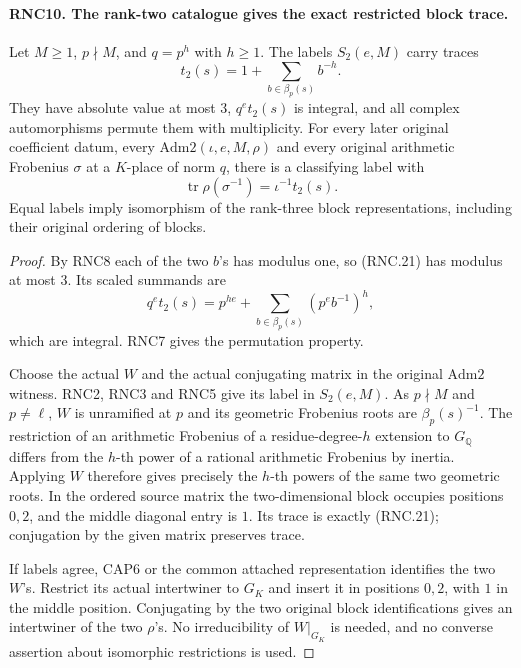 \documentclass[11pt,a4paper]{article}
\numberwithin{equation}{section}
\theoremstyle{remark}\newtheorem{remark}[theorem]{Remark}
\begin{document}
\paragraph{RNC10. The rank-two catalogue gives the exact restricted block trace.}
\label{claim:RNC10}
Let $M\geq1$, $p\nmid M$, and $q=p^h$ with $h\geq1$.
The labels $S_2(e,M)$ carry traces
\[
                  t_2(s)=1+\sum_{b\in\beta_p(s)}b^{-h}.
                                                               \tag{RNC.21}
\]
They have absolute value at most $3$, $q^e t_2(s)$ is
integral, and all complex automorphisms permute them with
multiplicity.  For every later original coefficient datum,
every $\mathrm{Adm2}(\iota,e,M,\rho)$ and every original
arithmetic Frobenius $\sigma$ at a $K$-place of norm $q$,
there is a classifying label with
\[
         \operatorname{tr}\rho(\sigma^{-1})=\iota^{-1}t_2(s).
                                                               \tag{RNC.22}
\]
Equal labels imply isomorphism of the rank-three block
representations, including their original ordering of blocks.
\begin{proof}
By RNC8 each of the two $b$'s has modulus one, so (RNC.21)
has modulus at most $3$.  Its scaled summands are
\[
 q^e t_2(s)=p^{he}+\sum_{b\in\beta_p(s)}(p^e b^{-1})^h,
                                                               \tag{RNC.23}
\]
which are integral.  RNC7 gives the permutation property.

Choose the actual $W$ and the actual conjugating matrix in
the original $\mathrm{Adm2}$ witness.  RNC2, RNC3 and RNC5
give its label in $S_2(e,M)$.  As $p\nmid M$ and
$p\ne\ell$, $W$ is unramified at $p$ and its geometric
Frobenius roots are $\beta_p(s)^{-1}$.  The restriction of
an arithmetic Frobenius of a residue-degree-$h$ extension
to $G_{\mathbb Q}$ differs from the $h$-th power of a
rational arithmetic Frobenius by inertia.  Applying $W$
therefore gives precisely the $h$-th powers of the same
two geometric roots.  In the ordered source matrix the
two-dimensional block occupies positions $0,2$, and the
middle diagonal entry is $1$.  Its trace is exactly
(RNC.21); conjugation by the given matrix preserves trace.

If labels agree, CAP6 or the common attached representation
identifies the two $W$'s.  Restrict its actual intertwiner
to $G_K$ and insert it in positions $0,2$, with $1$ in the
middle position.  Conjugating by the two original block
identifications gives an intertwiner of the two $\rho$'s.
No irreducibility of $W|_{G_K}$ is needed, and no converse
assertion about isomorphic restrictions is used.
\end{proof}
\end{document}
